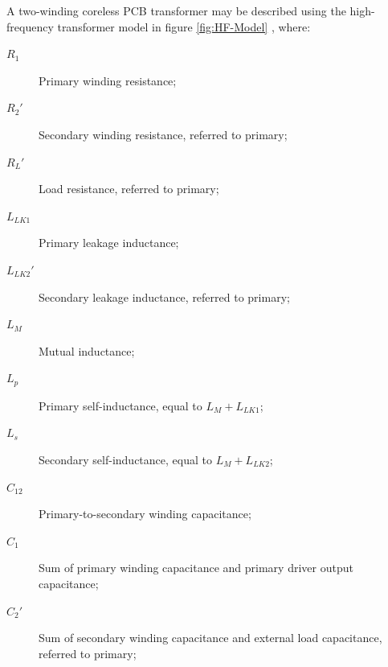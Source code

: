 \documentclass[conference]{IEEEtran}
\begin{document}
A two-winding coreless PCB transformer may be described using the high-frequency transformer model in figure \ref{fig:HF-Model} \cite{TangHuiFundamental}, where:
\begin{description}
\item[\hspace{-10pt}$ R_{1} $]    \hspace{-15pt} Primary winding resistance;
\item[\hspace{-10pt}$ R_{2}' $]   \hspace{-15pt} Secondary winding resistance, referred to primary;
\item[\hspace{-10pt}$ R_{L}' $]   \hspace{-15pt} Load resistance, referred to primary;
\item[\hspace{-10pt}$ L_{LK1} $]  \hspace{-15pt} Primary leakage inductance;
\item[\hspace{-10pt}$ L_{LK2}' $] \hspace{-15pt} Secondary leakage inductance, referred to primary;
\item[\hspace{-10pt}$ L_{M} $]    \hspace{-15pt} Mutual inductance;
\item[\hspace{-10pt}$ L_{p} $]    \hspace{-15pt} Primary self-inductance, equal to $ L_{M} + L_{LK1} $;
\item[\hspace{-10pt}$ L_{s} $]    \hspace{-15pt} Secondary self-inductance, equal to $ L_{M} + L_{LK2} $;
\item[\hspace{-10pt}$ C_{12} $]   \hspace{-15pt} Primary-to-secondary winding capacitance;
\item[\hspace{-10pt}$ C_{1} $]    \hspace{-15pt} Sum of primary winding capacitance and primary driver output capacitance;
\item[\hspace{-10pt}$ C_{2}' $]   \hspace{-15pt} Sum of secondary winding capacitance and external load capacitance, referred to primary;

\end{description}
\end{document}
